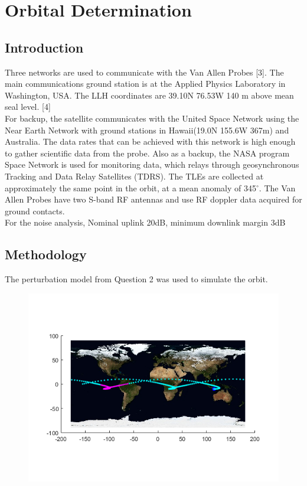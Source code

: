 \documentclass[Space3_Assign1.tex]{subfiles}
\begin{document}
\newpage
\section{Orbital Determination}

\subsection{Introduction}
Three networks are used to communicate with the Van Allen Probes [3]. The main communications ground station is at the Applied Physics Laboratory in Washington, USA. The LLH coordinates are 39.10N 76.53W 140 m above mean seal level. [4] \\
For backup, the satellite communicates with the United Space Network using the Near Earth Network with ground stations in Hawaii(19.0N 155.6W 367m) and Australia. The data rates that can be achieved with this network is high enough to gather scientific data from the probe. Also as a backup, the NASA program Space Network is used for monitoring data, which relays through geosynchronous Tracking and Data Relay Satellites (TDRS). The TLEs are collected at approximately the same point in the orbit, at a mean anomaly of 345$^{\circ}$. The Van Allen Probes have two S-band RF antennas and use RF doppler data acquired for ground contacts.\\
For the noise analysis, 
Nominal uplink 20dB, minimum downlink margin 3dB

\subsection{Methodology}
The perturbation model from Question 2 was used to simulate the orbit.
\begin{figure}[h!]
\centering
\caption{}
\label{fig:Q3_gnd}
\includegraphics[width=1\linewidth]{Q3_gnd}
\end{figure}
\end{document}
